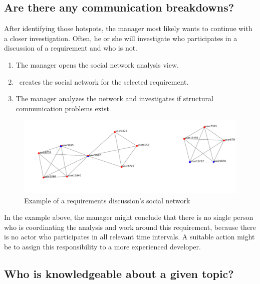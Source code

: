 \subsection{Are there any communication breakdowns?}
After identifying those hotspots, the manager most likely wants to continue with a closer investigation. 
Often, he or she will investigate who participates in a discussion of a requirement and who is not.
\begin{enumerate}
\item The manager opens the social network analysis view.
\item \viss\ creates the social network for the selected requirement.
\item The manager analyzes the network and investigates if structural communication problems exist.
\end{enumerate}

\begin{figure}
\includegraphics[width=\columnwidth]{img/example-sn}
\caption{Example of a requirements discussion's social network}
\label{fig:example-sn}
\end{figure}

In the example above, the manager might conclude that there is no single person who is coordinating the analysis and work around this requirement, because there is no actor who participates in all relevant time intervals.
A suitable action might be to assign this responsibility to a more experienced developer.

\subsection{Who is knowledgeable about a given topic?}

